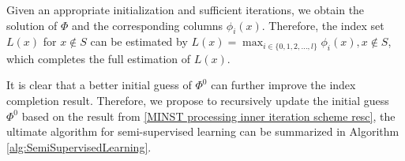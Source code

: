 \documentclass[letterpaper,10pt]{article}
\newcommand{\D}{\mathcal{D}}
\begin{document}
Given an appropriate initialization and sufficient iterations, we obtain the solution of $\Phi$ and the corresponding columns $\phi_i(x)$. Therefore, the index set $L(x)$ for $x \notin S$ can be estimated by $L(x) = \max_{i \in \{0,1,2,\ldots,l\}} \phi_i(x), x \notin S$, which completes the full estimation of $L(x)$.
%
%
%
%
%

It is clear that a better initial guess of $\Phi^0$ can further improve the index completion result. Therefore, we propose to recursively update the initial guess $\Phi^0$ based on the result from \eqref{MINST processing inner iteration scheme resc}, the ultimate algorithm for semi-supervised learning can be summarized in Algorithm \ref{alg:SemiSupervisedLearning}.
\end{document}
